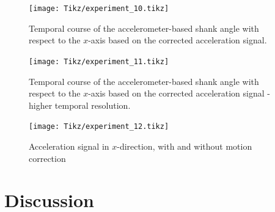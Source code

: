 \begin{figure}
	\centering
	\setlength\figureheight{7cm} 
	\setlength\figurewidth{\textwidth}
	\texttt{[image: Tikz/experiment\_10.tikz]}
	\caption{Temporal course of the accelerometer-based shank angle with respect to the $x$-axis based on the corrected acceleration signal.}
	\label{fig:experiment_10}
\end{figure}

\begin{figure}
	\centering
	\setlength\figureheight{7cm} 
	\setlength\figurewidth{\textwidth}
	\texttt{[image: Tikz/experiment\_11.tikz]}
	\caption{Temporal course of the accelerometer-based shank angle with respect to the $x$-axis based on the corrected acceleration signal - higher temporal resolution.}
	\label{fig:experiment_11}
\end{figure}

\begin{figure}
	\centering
	\setlength\figureheight{7cm} 
	\setlength\figurewidth{\textwidth}
	\texttt{[image: Tikz/experiment\_12.tikz]}
	\caption{Acceleration signal in $x$-direction, with and without motion correction}
	\label{fig:experiment_12}
\end{figure}


%

\section{Discussion}

